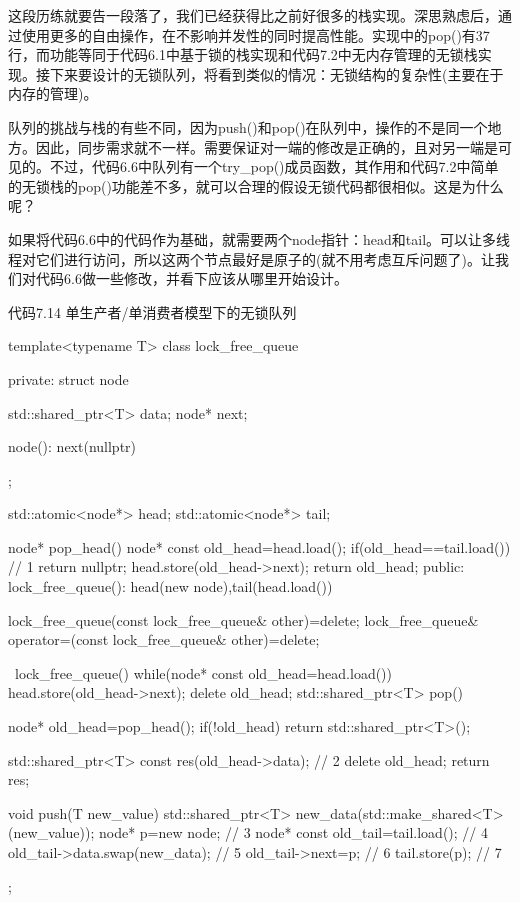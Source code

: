 这段历练就要告一段落了，我们已经获得比之前好很多的栈实现。深思熟虑后，通过使用更多的自由操作，在不影响并发性的同时提高性能。实现中的pop()有37行，而功能等同于代码6.1中基于锁的栈实现和代码7.2中无内存管理的无锁栈实现。接下来要设计的无锁队列，将看到类似的情况：无锁结构的复杂性(主要在于内存的管理)。


队列的挑战与栈的有些不同，因为push()和pop()在队列中，操作的不是同一个地方。因此，同步需求就不一样。需要保证对一端的修改是正确的，且对另一端是可见的。不过，代码6.6中队列有一个try\_pop()成员函数，其作用和代码7.2中简单的无锁栈的pop()功能差不多，就可以合理的假设无锁代码都很相似。这是为什么呢？

如果将代码6.6中的代码作为基础，就需要两个node指针：head和tail。可以让多线程对它们进行访问，所以这两个节点最好是原子的(就不用考虑互斥问题了)。让我们对代码6.6做一些修改，并看下应该从哪里开始设计。

代码7.14 单生产者/单消费者模型下的无锁队列

\begin{cpp}
template<typename T>
class lock_free_queue
{
private:
  struct node
  {
    std::shared_ptr<T> data;
    node* next;

    node():
       next(nullptr)
    {}
  };

  std::atomic<node*> head;
  std::atomic<node*> tail;

  node* pop_head()
  {
    node* const old_head=head.load();
    if(old_head==tail.load())  // 1
    {
      return nullptr;
    }
    head.store(old_head->next);
    return old_head;
  }
public:
  lock_free_queue():
      head(new node),tail(head.load())
  {}

  lock_free_queue(const lock_free_queue& other)=delete;
  lock_free_queue& operator=(const lock_free_queue& other)=delete;

  ~lock_free_queue()
  {
    while(node* const old_head=head.load())
    {
      head.store(old_head->next);
      delete old_head;
    }
  }
  std::shared_ptr<T> pop()
  {
    node* old_head=pop_head();
    if(!old_head)
    {
      return std::shared_ptr<T>();
    }

    std::shared_ptr<T> const res(old_head->data);  // 2
    delete old_head;
    return res;
  }

  void push(T new_value)
  {
    std::shared_ptr<T> new_data(std::make_shared<T>(new_value));
    node* p=new node;  // 3
    node* const old_tail=tail.load();  // 4
    old_tail->data.swap(new_data);  // 5
    old_tail->next=p;  // 6
    tail.store(p);  // 7
  }
};
\end{cpp}

